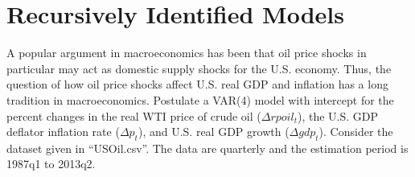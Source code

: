 \section[Recursively Identified Models]{Recursively Identified Models\label{ex:RecursivelyIdentifiedModels}}
A popular argument in macroeconomics has been that oil price shocks in particular may act as domestic supply shocks for the U.S. economy.
Thus, the question of how oil price shocks affect U.S. real GDP and inflation has a long tradition in macroeconomics.
 Postulate a VAR{(4)} model with intercept for the percent changes in the real WTI price of crude oil (\(\Delta rpoil_t\)),
  the U.S. GDP deflator inflation rate (\(\Delta p_t\)),
  and U.S. real GDP growth (\(\Delta gdp_t\)).
Consider the dataset given in \enquote{USOil.csv}.
The data are quarterly and the estimation period is 1987q1 to 2013q2.

